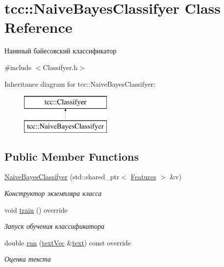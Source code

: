 \hypertarget{classtcc_1_1_naive_bayes_classifyer}{}\section{tcc\+:\+:Naive\+Bayes\+Classifyer Class Reference}
\label{classtcc_1_1_naive_bayes_classifyer}


Наивный байесовский классификатор  




{\ttfamily \#include $<$Classifyer.\+h$>$}

Inheritance diagram for tcc\+:\+:Naive\+Bayes\+Classifyer\+:\begin{figure}[H]
\begin{center}
\leavevmode
\includegraphics[height=2.000000cm]{classtcc_1_1_naive_bayes_classifyer}
\end{center}
\end{figure}
\subsection*{Public Member Functions}
\begin{DoxyCompactItemize}
\item 
\hyperlink{classtcc_1_1_naive_bayes_classifyer_ae49c42da81a9dd855bd09b2cb4f6816c}{Naive\+Bayes\+Classifyer} (std\+::shared\+\_\+ptr$<$ \hyperlink{classtcc_1_1_features}{Features} $>$ \&v)
\begin{DoxyCompactList}\small\item\em Конструктор экземпляра класса \end{DoxyCompactList}\item 
void \hyperlink{classtcc_1_1_naive_bayes_classifyer_a2e33142e454481ff8d217626050c54a7}{train} () override\hypertarget{classtcc_1_1_naive_bayes_classifyer_a2e33142e454481ff8d217626050c54a7}{}\label{classtcc_1_1_naive_bayes_classifyer_a2e33142e454481ff8d217626050c54a7}

\begin{DoxyCompactList}\small\item\em Запуск обучения классификатора \end{DoxyCompactList}\item 
double \hyperlink{classtcc_1_1_naive_bayes_classifyer_aec3d7dfdb8be9b48adf8e6489d97115d}{run} (\hyperlink{namespacetcc_a9bdf9e81347b7904a6a7f8427d6465dc}{text\+Vec} \&\hyperlink{group__aliases_ga085c5ca5bf5645ff17c0ede30f56b08f}{text}) const  override
\begin{DoxyCompactList}\small\item\em Оценка текста \end{DoxyCompactList}\end{DoxyCompactItemize}


